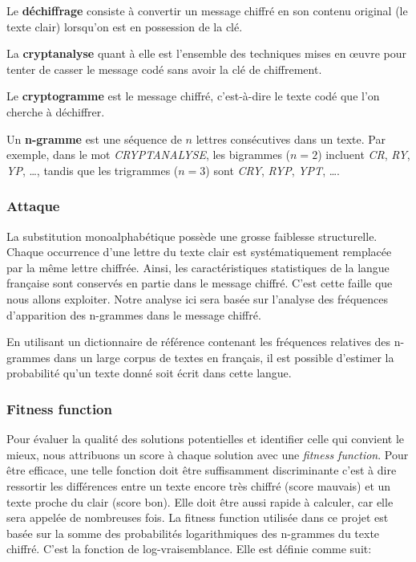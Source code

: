 \documentclass[a4paper]{article}
\begin{document}
Le \textbf{déchiffrage} consiste à convertir un message chiffré en son contenu original (le texte clair) lorsqu'on est en possession de la clé.

La \textbf{cryptanalyse} quant à elle est l'ensemble des techniques mises en œuvre pour tenter de casser le message codé sans avoir la clé de chiffrement.

Le \textbf{cryptogramme} est le message chiffré, c'est-à-dire le texte codé que l'on cherche à déchiffrer.

Un \textbf{n-gramme} est une séquence de $n$ lettres consécutives dans un texte.
Par exemple, dans le mot \textit{CRYPTANALYSE}, les bigrammes ($n=2$) incluent \textit{CR}, \textit{RY}, \textit{YP}, \ldots, tandis que les trigrammes ($n=3$) sont \textit{CRY}, \textit{RYP}, \textit{YPT}, \ldots.  


\subsubsection{Attaque}

La substitution monoalphabétique possède une grosse faiblesse structurelle. Chaque occurrence d’une lettre du texte clair est systématiquement remplacée par la même lettre chiffrée. Ainsi, les caractéristiques statistiques de la langue française sont conservés en partie dans le message chiffré.  
C'est cette faille que nous allons exploiter.
Notre analyse ici sera basée sur l’analyse des fréquences d’apparition des n-grammes dans le message chiffré.

En utilisant un dictionnaire de référence contenant les fréquences relatives des n-grammes dans un large corpus de textes en français, il est possible d’estimer la probabilité qu’un texte donné soit écrit dans cette langue.

\subsubsection{Fitness function}
Pour évaluer la qualité des solutions potentielles et identifier celle qui convient le mieux, nous attribuons un score à chaque solution avec une \textit{fitness function}.
Pour être efficace, une telle fonction doit être suffisamment discriminante c'est à dire ressortir les différences entre un texte encore très chiffré (score mauvais) et un texte proche du clair (score bon). Elle doit être aussi rapide à calculer, car elle sera appelée de nombreuses fois.   
La fitness function utilisée dans ce projet est basée sur la somme des probabilités logarithmiques des n-grammes du texte chiffré. C’est la fonction de log-vraisemblance. Elle est définie comme suit:
\end{document}
